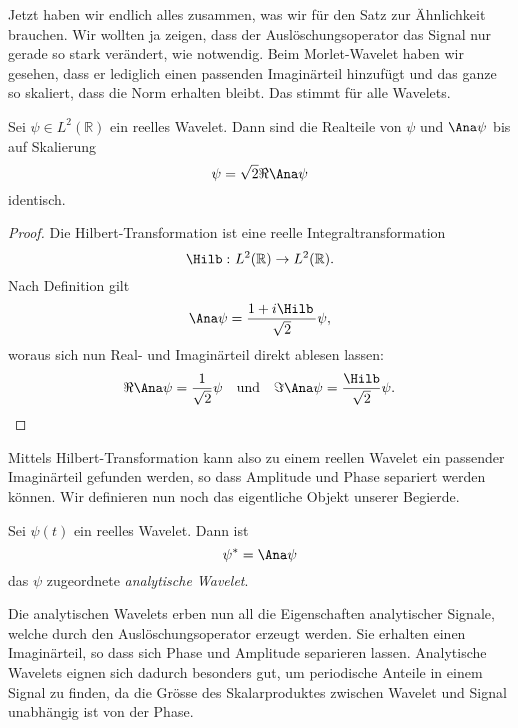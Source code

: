 Jetzt haben wir endlich alles zusammen, was wir für den Satz zur Ähnlichkeit brauchen.
Wir wollten ja zeigen, dass der Auslöschungsoperator das Signal nur gerade so stark verändert, wie notwendig.
Beim Morlet-Wavelet haben wir gesehen, dass er lediglich einen passenden Imaginärteil hinzufügt und das ganze so skaliert, dass die Norm erhalten bleibt.
Das stimmt für alle Wavelets.

\begin{satz}
	Sei $\psi \in L^2(\mathbb R)$ ein reelles Wavelet. Dann sind die Realteile von $\psi$ und $\Ana\psi$ bis auf Skalierung
	\[ \psi = \sqrt 2 \Re\Ana\psi\]
identisch.
\end{satz}

\begin{proof}
	Die Hilbert-Transformation ist eine reelle Integraltransformation
	\[\Hilb\,\colon L^2(\mathbb{R}) \to L^2(\mathbb{R}).\]
	Nach Definition gilt
	\[\Ana\psi = \frac{1 + i\Hilb\,}{\sqrt 2}\psi,\]
	woraus sich nun Real- und Imaginärteil direkt ablesen lassen:
	\[\Re \Ana\psi = \frac{1}{\sqrt 2}\psi \quad \text{und}\quad \Im \Ana\psi = \frac{\Hilb }{\sqrt 2}\psi.\qedhere\]
\end{proof}

Mittels Hilbert-Transformation kann also zu einem reellen Wavelet ein passender Imaginärteil gefunden werden, so dass Amplitude und Phase separiert werden können.
Wir definieren nun noch das eigentliche Objekt unserer Begierde.

\begin{satz}
	\label{complex:analytic-wavelet}
	Sei $\psi(t)$ ein reelles Wavelet. Dann ist
	\begin{equation}
	\psi^\ast = \Ana\psi
	\end{equation}
	das $\psi$ zugeordnete \emph{analytische Wavelet}.
%
%
\end{satz}

Die analytischen Wavelets erben nun all die Eigenschaften analytischer Signale, welche durch den Auslöschungsoperator erzeugt werden.
Sie erhalten einen Imaginärteil, so dass sich Phase und Amplitude separieren lassen.
Analytische Wavelets eignen sich dadurch besonders gut, um periodische Anteile in einem Signal zu finden, da die Grösse des Skalarproduktes zwischen Wavelet und Signal unabhängig ist von der Phase.
